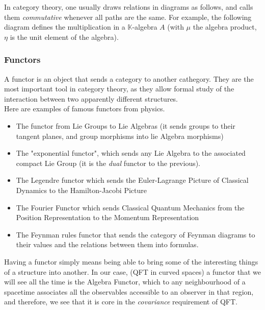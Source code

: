 \documentclass[a4paper,11pt]{article}
\numberwithin{equation}{section}
\theoremstyle{definition}
\begin{document}
    In category theory, one usually draws relations in diagrams as follows, and calls them \emph{commutative} whenever all paths are the same. For example, the following diagram defines the multiplication in a $\mathbb{K}$-algebra $A$ (with $\mu$ the algebra product, $\eta$ is the unit element of the algebra).\\
    

    \subsubsection{Functors}
    A functor is an object that sends a category to another cathegory. They are the most important tool in category theory, as they allow formal study of the interaction between two apparently different structures.\\
    Here are examples of famous functors from physics.
    \begin{itemize}
        \item The functor from Lie Groups to Lie Algebras (it sends groups to their tangent planes, and group morphisms into lie Algebra morphisms)
        \item  The "exponential functor", which sends any Lie Algebra to the associated compact Lie Group (it is the \emph{dual} functor to the previous).
        \item The Legendre functor which sends the Euler-Lagrange Picture of Classical Dynamics to the Hamilton-Jacobi Picture
        \item The Fourier Functor which sends Classical Quantum Mechanics from the Position Representation to the Momentum Representation
        \item The Feynman rules functor that sends the category of Feynman diagrams to their values and the relations between them into formulas.
    \end{itemize}
    Having a functor simply means being able to bring some of the interesting things of a structure into another. In our case, (QFT in curved spaces) a functor that we will see all the time is the Algebra Functor, which to any neighbourhood of a spacetime associates all the observables accessible to an observer in that region, and therefore, we see that it is core in the \emph{covariance} requirement of QFT.
\end{document}
